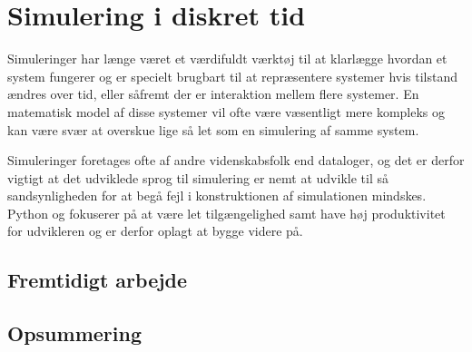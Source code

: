 \chapter{Simulering i diskret tid}

Simuleringer har længe været et værdifuldt værktøj til at klarlægge hvordan et 
system fungerer og er specielt brugbart til at repræsentere systemer hvis 
tilstand ændres over tid, eller såfremt der er interaktion mellem flere systemer. En 
matematisk model af disse systemer vil ofte være væsentligt mere kompleks og 
kan være svær at overskue lige så let som en simulering af samme system. 

Simuleringer foretages ofte af andre videnskabsfolk end dataloger, og det er 
derfor vigtigt at det udviklede sprog til simulering er nemt at udvikle til så sandsynligheden for at begå fejl i konstruktionen af simulationen mindskes.  
Python og \pycsp  fokuserer på at være  let tilgængelighed samt have høj produktivitet for udvikleren og er derfor oplagt at bygge videre på.

%
%
 
%
\section{Fremtidigt arbejde}
\section{Opsummering}
